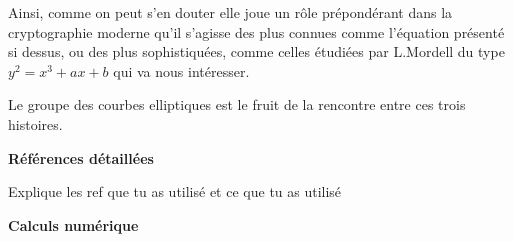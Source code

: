 Ainsi, comme on peut s'en douter elle joue un rôle prépondérant dans la
cryptographie moderne qu'il s'agisse des plus connues comme l'équation présenté si dessus, ou
des plus sophistiquées, comme celles étudiées par L.Mordell du type $y^2 = x^3 + ax+b$ qui va
nous intéresser.

Le groupe des courbes elliptiques est le fruit de la rencontre entre ces trois
histoires.

\begin{center}
    \textbf{Références détaillées}

    Explique les ref que tu as utilisé et ce que tu as utilisé
\end{center}

\begin{center}
    \textbf{Calculs numérique}
\end{center}












